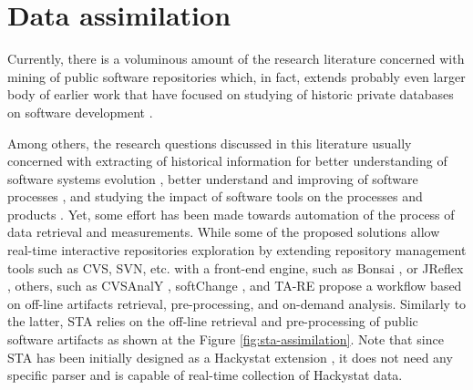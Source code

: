 \section{Data assimilation}
Currently, there is a voluminous amount of the research literature concerned with mining of public software repositories 
\cite{citeulike:2710928} which, in fact, extends probably even larger body of earlier work that have focused on studying 
of historic private databases on software development \cite{citeulike:393158} \cite{citeulike:13125375} \cite{citeulike:13125481}.

Among others, the research questions discussed in this literature usually concerned with extracting of 
historical information for better understanding of software systems evolution \cite{citeulike:277045} \cite{citeulike:4000311}, 
better understand and improving of software processes \cite{citeulike:5803126}, 
and studying the impact of software tools on the processes and products \cite{citeulike:13125389}. 
Yet, some effort has been made towards automation of the process of data retrieval and measurements. 
While some of the proposed solutions allow real-time interactive repositories exploration by extending 
repository management tools such as CVS, SVN, etc. with a front-end engine, such as Bonsai \cite{bonsai},
or JReflex \cite{citeulike:3017440}, others, such as CVSAnalY \cite{citeulike:6544724}, softChange \cite{citeulike:13125395},
and {TA}-{RE} \cite{citeulike:4000311} propose a workflow based on off-line artifacts retrieval, 
pre-processing, and on-demand analysis.
Similarly to the latter, STA relies on the off-line retrieval and pre-processing of public software artifacts as
shown at the Figure \ref{fig:sta-assimilation}. Note that since STA has been initially designed as a Hackystat 
extension \cite{csdl2-10-09}, it does not need any specific parser and is capable of real-time 
collection of Hackystat data.

